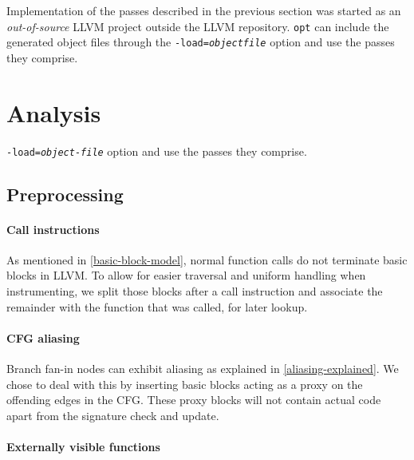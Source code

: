 Implementation of the passes described in the previous section was started as
an \emph{out-of-source} LLVM
project outside the LLVM repository. \texttt{opt} can include the generated
object files through the \texttt{-load=\textit{objectfile}} option and use the
passes they comprise.

\section{Analysis}

\texttt{-load=\textit{object-file}} option and use the passes they comprise.

\subsection{Preprocessing}

\paragraph{Call instructions}

As mentioned in \ref{basic-block-model}, normal function calls do not terminate
basic blocks in LLVM. To allow for easier traversal and uniform handling when
instrumenting, we split those blocks after a call instruction and associate the
remainder with the function that was called, for later lookup.


\paragraph{CFG aliasing}

Branch fan-in nodes can exhibit aliasing as explained in
\ref{aliasing-explained}. We chose to deal with this by inserting basic blocks
acting as a proxy on the offending edges in the CFG.  These proxy blocks will not contain actual code apart from the
signature check and update.


\paragraph{Externally visible functions}

